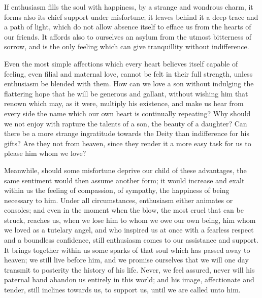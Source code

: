 If enthusiasm fills the soul with happiness, by a strange and wondrous
charm, it forms also its chief support under misfortune; it leaves
behind it a deep trace and a path of light, which do not allow absence
itself to efface us from the hearts of our friends. It affords also to
ourselves an asylum from the utmost bitterness of sorrow, and is the
only feeling which can give tranquillity without indifference.

Even the most simple affections which every heart believes itself
capable of feeling, even filial and maternal love, cannot be felt in
their full strength, unless enthusiasm be blended with them. How can
we love a son without indulging the flattering hope that he will be
generous and gallant, without wishing him that renown which may, as it
were, multiply his existence,  and make us hear from every
side the name which our own heart is continually repeating? Why should
we not enjoy with rapture the talents of a son, the beauty of a
daughter? Can there be a more strange ingratitude towards the Deity
than indifference for his gifts? Are they not from heaven, since they
render it a more easy task for us to please him whom we love?

Meanwhile, should some misfortune deprive our child of these
advantages, the same sentiment would then assume another form; it
would increase and exalt within us the feeling of compassion, of
sympathy, the happiness of being necessary to him. Under all
circumstances, enthusiasm either animates or consoles; and even in the
moment when the blow, the most cruel that can be struck, reaches us,
when we lose him to whom we owe our own being, him whom we loved as a
tutelary angel, and who inspired us at once with a fearless respect
and a boundless confidence, still enthusiasm comes to our assistance
and support. It brings together within us some sparks of that soul
which has passed away to heaven; we still live before him, and we
promise ourselves that we will one day transmit to posterity the
history of his life. Never, we feel assured, never will his paternal
hand abandon us entirely in this world; and his image, affectionate
and tender, still inclines towards us, to support us, until we are
called unto him.


